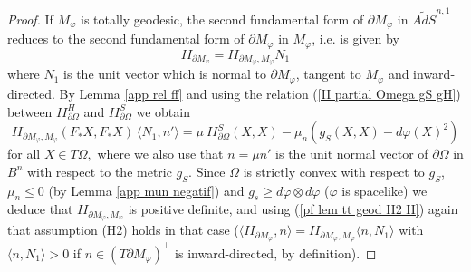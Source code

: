 \documentclass[10pt,reqno,oneside]{amsart}
\theoremstyle{definition}
\theoremstyle{remark}
\begin{document}
\begin{proof}
If $M_{\varphi}$ is totally geodesic, the second fundamental form of $\partial M_{\varphi}$ in $\widetilde{AdS}^{n,1}$ reduces to the second fundamental form of $\partial M_{\varphi}$ in $M_{\varphi}$, i.e. is given by
\begin{equation}\label{pf lem tt geod H2 II}
II_{\partial M_{\varphi}}=II_{\partial M_{\varphi},M_{\varphi}}N_1
\end{equation}
where $N_1$ is the unit vector which is normal to $\partial M_{\varphi}$, tangent to $M_{\varphi}$ and inward-directed. By Lemma \ref{app rel ff} and using the relation (\ref{II partial Omega gS gH}) between $II^H_{\partial\Omega}$ and $II^S_{\partial\Omega}$ we obtain
$$II_{\partial M_{\varphi},M_{\varphi}}(F_*X,F_*X)\ \langle N_1,n'\rangle=\mu\ II^S_{\partial\Omega}(X,X)-\mu_n\left(g_S(X,X)-d\varphi(X)^2\right)$$
for all $X\in T\Omega,$ where we also use that $n=\mu n'$ is the unit normal vector of $\partial\Omega$ in $B^n$ with respect to the metric $g_S.$ Since $\Omega$ is strictly convex with respect to $g_S$, $\mu_n\leq 0$ (by Lemma \ref{app mun negatif}) and $g_s\geq d\varphi\otimes d\varphi$ ($\varphi$ is spacelike) we deduce that  $II_{\partial M_{\varphi},M_{\varphi}}$ is positive definite, and using (\ref{pf lem tt geod H2 II}) again that assumption (H2) holds in that case ($\langle II_{\partial M_{\varphi}},n\rangle=II_{\partial M_{\varphi},M_{\varphi}}\langle n,N_1\rangle$ with $\langle n,N_1\rangle>0$ if $n\in (T\partial M_{\varphi})^{\perp}$ is inward-directed, by definition).
\end{proof}
\end{document}
